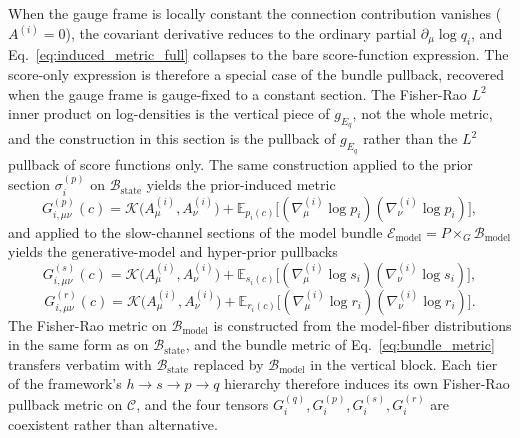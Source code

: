 \documentclass[11pt]{article}
\begin{document}
When the gauge frame is locally constant the connection contribution vanishes ($A^{(i)} = 0$), the covariant derivative reduces to the ordinary partial $\partial_\mu \log q_i$, and Eq.~\eqref{eq:induced_metric_full} collapses to the bare score-function expression. The score-only expression is therefore a special case of the bundle pullback, recovered when the gauge frame is gauge-fixed to a constant section. The Fisher-Rao $L^2$ inner product on log-densities is the vertical piece of $g_{E_q}$, not the whole metric, and the construction in this section is the pullback of $g_{E_q}$ rather than the $L^2$ pullback of score functions only. The same construction applied to the prior section $\sigma_i^{(p)}$ on $\mathcal{B}_{\mathrm{state}}$ yields the prior-induced metric
\begin{equation}
\boxed{G^{(p)}_{i,\mu\nu}(c) = \mathcal{K}\big(A^{(i)}_\mu, A^{(i)}_\nu\big) + \mathbb{E}_{p_i(c)}\big[(\nabla^{(i)}_\mu \log p_i)(\nabla^{(i)}_\nu \log p_i)\big],}
\end{equation}
and applied to the slow-channel sections of the model bundle $\mathcal{E}_{\mathrm{model}} = P \times_G \mathcal{B}_{\mathrm{model}}$ yields the generative-model and hyper-prior pullbacks
\begin{equation}
\boxed{G^{(s)}_{i,\mu\nu}(c) = \mathcal{K}\big(A^{(i)}_\mu, A^{(i)}_\nu\big) + \mathbb{E}_{s_i(c)}\big[(\nabla^{(i)}_\mu \log s_i)(\nabla^{(i)}_\nu \log s_i)\big],}
\end{equation}
\begin{equation}
G^{(r)}_{i,\mu\nu}(c) = \mathcal{K}\big(A^{(i)}_\mu, A^{(i)}_\nu\big) + \mathbb{E}_{r_i(c)}\big[(\nabla^{(i)}_\mu \log r_i)(\nabla^{(i)}_\nu \log r_i)\big].
\end{equation}
The Fisher-Rao metric on $\mathcal{B}_{\mathrm{model}}$ is constructed from the model-fiber distributions in the same form as on $\mathcal{B}_{\mathrm{state}}$, and the bundle metric of Eq.~\eqref{eq:bundle_metric} transfers verbatim with $\mathcal{B}_{\mathrm{state}}$ replaced by $\mathcal{B}_{\mathrm{model}}$ in the vertical block. Each tier of the framework's $h \to s \to p \to q$ hierarchy therefore induces its own Fisher-Rao pullback metric on $\mathcal{C}$, and the four tensors $G_i^{(q)}, G_i^{(p)}, G_i^{(s)}, G_i^{(r)}$ are coexistent rather than alternative.
\end{document}
